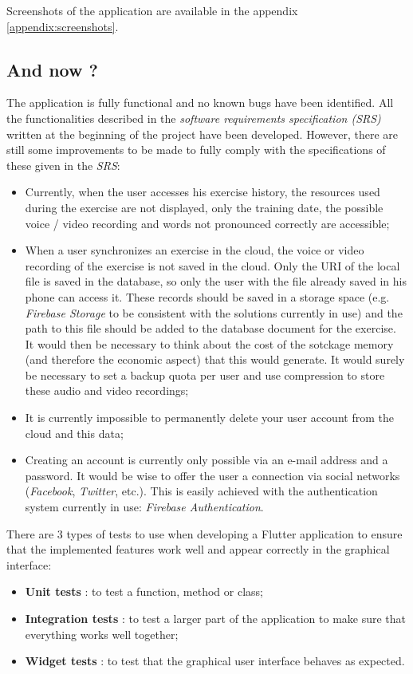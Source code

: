Screenshots of the application are available in the appendix \ref{appendix:screenshots}.

\subsection{And now ?}
The application is fully functional and no known bugs have been identified. All the functionalities described in the \textit{software requirements specification (SRS)} written at the beginning of the project have been developed. However, there are still some improvements to be made to fully comply with the specifications of these given in the \textit{SRS}:

\begin{itemize}
  \item Currently, when the user accesses his exercise history, the resources used during the exercise are not displayed, only the training date, the possible voice / video recording and words not pronounced correctly are accessible;
  \item When a user synchronizes an exercise in the cloud, the voice or video recording of the exercise is not saved in the cloud. Only the URI of the local file is saved in the database, so only the user with the file already saved in his phone can access it. These records should be saved in a storage space (e.g. \textit{Firebase Storage} to be consistent with the solutions currently in use) and the path to this file should be added to the database document for the exercise. It would then be necessary to think about the cost of the sotckage memory (and therefore the economic aspect) that this would generate. It would surely be necessary to set a backup quota per user and use compression to store these audio and video recordings;
  \item It is currently impossible to permanently delete your user account from the cloud and this data;
  \item Creating an account is currently only possible via an e-mail address and a password. It would be wise to offer the user a connection via social networks (\textit{Facebook}, \textit{Twitter}, etc.). This is easily achieved with the authentication system currently in use: \textit{Firebase Authentication}.
\end{itemize}

There are 3 types of tests to use when developing a Flutter application to ensure that the implemented features work well and appear correctly in the graphical interface:
\begin{itemize}
  \item \textbf{Unit tests} : to test a function, method or class;
  \item \textbf{Integration tests} : to test a larger part of the application to make sure that everything works well together;
  \item \textbf{Widget tests} : to test that the graphical user interface behaves as expected.
\end{itemize}


